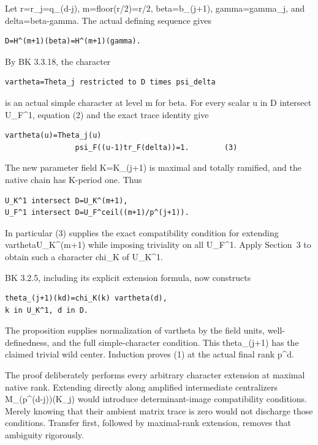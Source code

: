 Let r=r\_j=q\_(d-j), m=floor(r/2)=r/2, beta=b\_(j+1), gamma=gamma\_j,
and delta=beta-gamma. The actual defining sequence gives

\begin{Verbatim}[fontsize=\small,breaklines=true,breakanywhere=true]
D=H^(m+1)(beta)=H^(m+1)(gamma).
\end{Verbatim}

By BK 3.3.18, the character

\begin{Verbatim}[fontsize=\small,breaklines=true,breakanywhere=true]
vartheta=Theta_j restricted to D times psi_delta
\end{Verbatim}

is an actual simple character at level m for beta. For every scalar u in
D intersect U\_F\^{}1, equation (2) and the exact trace identity give

\begin{Verbatim}[fontsize=\small,breaklines=true,breakanywhere=true]
vartheta(u)=Theta_j(u)
                psi_F((u-1)tr_F(delta))=1.        (3)
\end{Verbatim}

The new parameter field K=K\_(j+1) is maximal and totally ramified, and
the native chain has K-period one. Thus

\begin{Verbatim}[fontsize=\small,breaklines=true,breakanywhere=true]
U_K^1 intersect D=U_K^(m+1),
U_F^1 intersect D=U_F^ceil((m+1)/p^(j+1)).
\end{Verbatim}

In particular (3) supplies the exact compatibility condition for
extending vartheta\textbar U\_K\^{}(m+1) while imposing triviality on
all U\_F\^{}1. Apply Section~3 to obtain such a character chi\_K of
U\_K\^{}1.

BK 3.2.5, including its explicit extension formula, now constructs

\begin{Verbatim}[fontsize=\small,breaklines=true,breakanywhere=true]
theta_(j+1)(kd)=chi_K(k) vartheta(d),
k in U_K^1, d in D.
\end{Verbatim}

The proposition supplies normalization of vartheta by the field units,
well-definedness, and the full simple-character condition. This
theta\_(j+1) has the claimed trivial wild center. Induction proves (1)
at the actual final rank p\^{}d.

The proof deliberately performs every arbitrary character extension at
maximal native rank. Extending directly along amplified intermediate
centralizers M\_(p\^{}(d-j))(K\_j) would introduce determinant-image
compatibility conditions. Merely knowing that their ambient matrix trace
is zero would not discharge those conditions. Transfer first, followed
by maximal-rank extension, removes that ambiguity rigorously.

